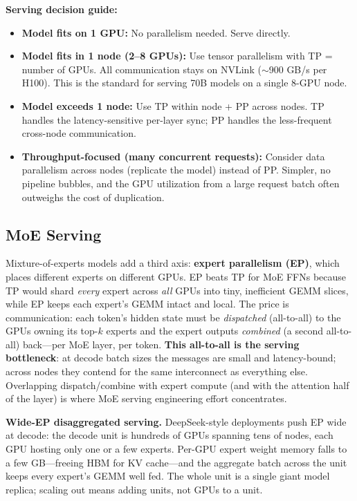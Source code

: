 \textbf{Serving decision guide:}
\begin{itemize}
    \item \textbf{Model fits on 1 GPU:} No parallelism needed. Serve directly.
    \item \textbf{Model fits in 1 node (2--8 GPUs):} Use tensor parallelism with TP = number of GPUs. All communication stays on NVLink ($\sim$900 GB/s per H100). This is the standard for serving 70B models on a single 8-GPU node.
    \item \textbf{Model exceeds 1 node:} Use TP within node + PP across nodes. TP handles the latency-sensitive per-layer sync; PP handles the less-frequent cross-node communication.
    \item \textbf{Throughput-focused (many concurrent requests):} Consider data parallelism across nodes (replicate the model) instead of PP. Simpler, no pipeline bubbles, and the GPU utilization from a large request batch often outweighs the cost of duplication.
\end{itemize}

\subsection{MoE Serving}
\label{sec:moe_serving}

Mixture-of-experts models add a third axis: \textbf{expert parallelism (EP)}, which places different experts on different GPUs. EP beats TP for MoE FFNs because TP would shard \textit{every} expert across \textit{all} GPUs into tiny, inefficient GEMM slices, while EP keeps each expert's GEMM intact and local. The price is communication: each token's hidden state must be \textit{dispatched} (all-to-all) to the GPUs owning its top-$k$ experts and the expert outputs \textit{combined} (a second all-to-all) back---per MoE layer, per token. \textbf{This all-to-all is the serving bottleneck}: at decode batch sizes the messages are small and latency-bound; across nodes they contend for the same interconnect as everything else. Overlapping dispatch/combine with expert compute (and with the attention half of the layer) is where MoE serving engineering effort concentrates.

\textbf{Wide-EP disaggregated serving.} DeepSeek-style deployments push EP wide at decode: the decode unit is hundreds of GPUs spanning tens of nodes, each GPU hosting only one or a few experts. Per-GPU expert weight memory falls to a few GB---freeing HBM for KV cache---and the aggregate batch across the unit keeps every expert's GEMM well fed. The whole unit is a single giant model replica; scaling out means adding units, not GPUs to a unit.

